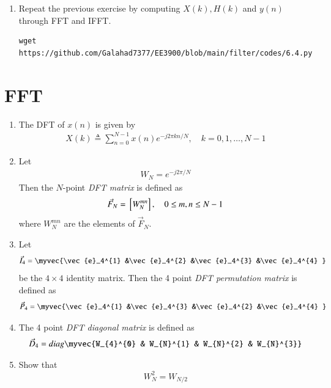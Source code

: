 \documentclass[journal,12pt,twocolumn]{IEEEtran}
\renewcommand\thesection{\arabic{section}}
\begin{document}
\begin{enumerate}[label=\thesection.\arabic*]
\item Repeat the previous exercise by computing $X(k), H(k)$ and $y(n)$ through FFT and 
IFFT.

\solution
\begin{lstlisting}
wget https://github.com/Galahad7377/EE3900/blob/main/filter/codes/6.4.py
\end{lstlisting}
\end{enumerate}
%
\section{FFT}
\begin{enumerate}[label=\thesection.\arabic*]
    \item The DFT of $x(n)$ is given by
    \begin{align}
        X(k) \triangleq \sum_{n=0}^{N-1} x(n) e^{-j 2 \pi k n / N}, \quad k=0,1, \ldots, N-1
    \end{align}
\item Let 
	\begin{align}
W_{N} = e^{-j2\pi/N} 
	\end{align}
		Then the $N$-point {\em DFT matrix} is defined as 
	\begin{align}
		\vec{F}_{N} = {}\left[W_{N}^{mn}\right], \quad 0 \le m,n \le N-1 
	\end{align}
	where $W_{N}^{mn}$ are the elements of $\vec{F}_{N}$.
\item Let 
	\begin{align}
		\vec{I}_4 = \myvec{\vec{e}_4^{1} &\vec{e}_4^{2} &\vec{e}_4^{3} &\vec{e}_4^{4} }
	\end{align}
		be the $4\times 4$ identity matrix.  Then the 4 point {\em DFT permutation matrix} is defined as 
	\begin{align}
		\vec{P}_4 = \myvec{\vec{e}_4^{1} &\vec{e}_4^{3} &\vec{e}_4^{2} &\vec{e}_4^{4} }
	\end{align}
\item The 4 point {\em DFT diagonal matrix} is defined as 
	\begin{align}
		\vec{D}_4 = diag\myvec{W_{4}^{0} & W_{N}^{1} & W_{N}^{2} & W_{N}^{3}}
	\end{align}
\item Show that 
\begin{equation}
    W_{N}^{2}=W_{N/2}
\end{equation}


\end{enumerate}
\end{document}
